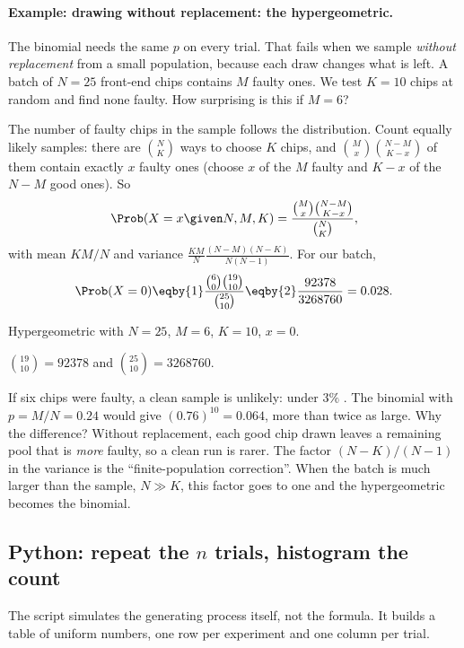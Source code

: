 \paragraph{Example: drawing without replacement: the hypergeometric.}
The binomial needs the same $p$ on every trial. That fails when we sample \emph{without replacement} from a small population, because each draw changes what is left. A batch of $N=25$ front-end chips contains $M$ faulty ones. We test $K=10$ chips at random and find none faulty. How surprising is this if $M=6$?

The number of faulty chips in the sample follows the  distribution. Count equally likely samples: there are $\binom NK$ ways to choose $K$ chips, and $\binom Mx\binom{N-M}{K-x}$ of them contain exactly $x$ faulty ones (choose $x$ of the $M$ faulty and $K-x$ of the $N-M$ good ones). So
\[
  \Prob(X=x\given N,M,K)=\frac{\binom Mx\binom{N-M}{K-x}}{\binom NK},
\]
with mean $KM/N$ and variance $\frac{KM}{N}\frac{(N-M)(N-K)}{N(N-1)}$. For our batch,
\begin{align*}
  \Prob(X=0) \eqby{1} \frac{\binom60\binom{19}{10}}{\binom{25}{10}} \eqby{2} \frac{92378}{3268760} = 0.028 .
\end{align*}
\begin{explain}
  \item Hypergeometric with $N=25$, $M=6$, $K=10$, $x=0$.
  \item $\binom{19}{10}=92378$ and $\binom{25}{10}=3268760$.
\end{explain}
If six chips were faulty, a clean sample is unlikely: under $3\%$ . The binomial with $p=M/N=0.24$ would give $(0.76)^{10}=0.064$, more than twice as large. Why the difference? Without replacement, each good chip drawn leaves a remaining pool that is \emph{more} faulty, so a clean run is rarer. The factor $(N-K)/(N-1)$ in the variance is the ``finite-population correction''. When the batch is much larger than the sample, $N\gg K$, this factor goes to one and the hypergeometric becomes the binomial.

\subsection{Python: repeat the $n$ trials, histogram the count}

The script  simulates the generating process itself, not the formula. It builds a table of uniform numbers, one row per experiment and one column per trial.

